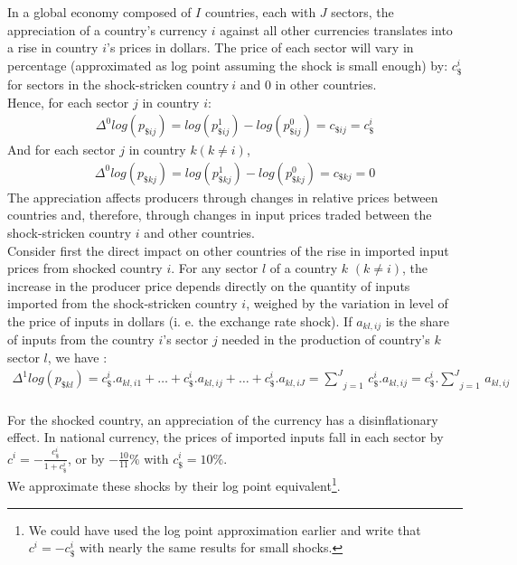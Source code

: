 \documentclass[12pt,a4paper]{paper}
\begin{document}
In a global economy composed of $I$ countries, each with $J$ sectors, the appreciation of a country's currency $i$ against all other currencies translates into a rise in country $i$'s prices in dollars. The price of each sector will vary in percentage (approximated as log point assuming the shock is small enough) by: $c_\$^i$ for sectors in the shock-stricken country$~i$ and 0 in other countries. \\
Hence, for each sector $j$ in country $i$:
\begin{eqnarray*}
 {{\Delta }^{0}}log(p_{\${ij}})=log(p_{\${ij}}^{1})-log(p_{\${ij}}^{0})=c_{\${ij}}=c_{\$}^i
  \end{eqnarray*}	
And for each sector $j$ in country $k (k\ne i)$,
\begin{eqnarray*}
 {{\Delta }^{0}}log(p_{\${kj}})=log(p_{\${kj}}^{1})-log(p_{\${kj}}^{0})=c_{\${kj}}=0
 \end{eqnarray*}	
The appreciation affects producers through changes in relative prices between countries and, therefore, through changes in input prices traded between the shock-stricken country $i$ and other countries. \\
Consider first the direct impact on other countries of the rise in imported input prices from shocked country $i$. 
For any sector $l$ of a country $k$ $(k\ne i)$, the increase in the producer price depends directly on the quantity of inputs imported from the shock-stricken country $i$, weighed by the variation in level of the price of inputs in dollars (i. e. the exchange rate shock). If $a_{kl,ij}$ is the share of inputs from the country $i$'s sector $j$ needed in the production of country's $k$ sector $l$, we have :\\
\begin{eqnarray}
\Delta ^1 log(p_{\${kl}})=c_\$^i.a_{kl,i1}+\ldots+c_\$^i.a_{kl,ij}+\ldots+c_\$^i.a_{kl,iJ}=\underset{j=1}{\overset{J}{\mathop\sum}}\,c_\$^i.a_{kl,ij}=c_\$^i.\underset{j=1}{\overset{J}{\mathop\sum}}\,a_{kl,ij}  
\label{eq:eq1} 
\end{eqnarray}
\\
For the shocked country, an appreciation of the currency has a disinflationary effect. In national currency, the prices of imported inputs fall in each sector by $c^i=-\frac{c_\$^i}{1+{c_\$^i}}$, or by $-\frac{10}{11}\%$ with $c_\$^i=10\%$.\\
We approximate these shocks by their log point equivalent\footnote{We could have used the log point approximation earlier and write that $c^i=-c_\$^i$ with nearly the same results for small shocks.}.
\end{document}
